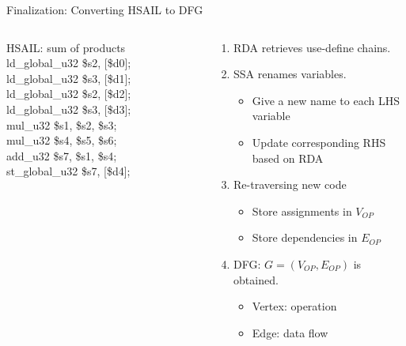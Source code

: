 \documentclass{beamer}
\begin{document}
\begin{CJK}{UTF8}{bkai}
    \begin{frame}{Finalization: Converting HSAIL to DFG}
        \begin{columns}
            \begin{column}{0.45\textwidth}
               \begin{block}{HSAIL: sum of products}
                   ld\_global\_u32 \$s2, [\$d0]; \\ 
                   ld\_global\_u32 \$s3, [\$d1]; \\ 
                   ld\_global\_u32 \$s2, [\$d2]; \\
                   ld\_global\_u32 \$s3, [\$d3]; \\
                   mul\_u32 \$s1, \$s2, \$s3; \\
                   mul\_u32 \$s4, \$s5, \$s6; \\
                   add\_u32 \$s7, \$s1, \$s4; \\
                   st\_global\_u32 \$s7, [\$d4]; \\
               \end{block} 
            \end{column}
            \begin{column}{0.55\textwidth}
                \begin{enumerate}
                    \item RDA retrieves use-define chains.
                    \item SSA renames variables.
                        \begin{itemize}
                            \item Give a new name to each LHS variable
                            \item Update corresponding RHS based on RDA
                        \end{itemize}
                    \item Re-traversing new code
                        \begin{itemize}
                            \item Store assignments in $V_{OP}$
                            \item Store dependencies in $E_{OP}$
                        \end{itemize}
                    \item DFG: $G = (V_{OP}, E_{OP})$ is obtained.
                        \begin{itemize}
                            \item Vertex: operation
                            \item Edge: data flow
                        \end{itemize}
                \end{enumerate}
           \end{column}
        \end{columns}
    \end{frame}


\end{CJK}
\end{document}
